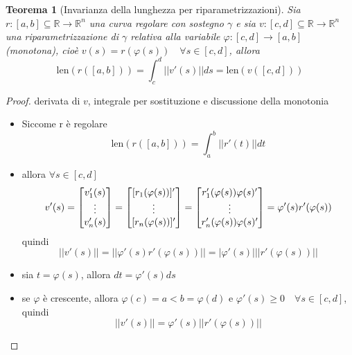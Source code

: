 \documentclass[12pt, a4paper]{article}
\theoremstyle{break}
\newtheorem{theorem}{Teorema} %
\begin{document}
\newpage
\begin{theorem} [Invarianza della lunghezza per riparametrizzazioni]
	Sia $r: [a,b] \subseteq \mathbb{R} \to \mathbb{R}^n$ una curva
	regolare con sostegno $\gamma$ e sia $v: [c,d] \subseteq \mathbb{R}
		\to \mathbb{R}^n$ una riparametrizzazione di $\gamma$ relativa
	alla variabile $ \varphi : [c,d] \to [a,b]$ (monotona), cioè
	$v(s) = r(\varphi (s)) \quad \forall s \in [c,d]$, allora
	\[
		\text{len}(r([a,b])) = \int_{c}^{d} || v'(s) || ds =
		\text{len}(v([c,d])) \]
\end{theorem}
\begin{proof} derivata di $v$, integrale per sostituzione e discussione della
	monotonia
	\begin{itemize}
		\item Siccome r è regolare
		      \[
			      \text{len}(r([a,b])) = \int_{a}^{b} || r'(t) || dt
		      \]
		\item allora $\forall s \in [c,d]$
		      \[
			      v'(s) =
			      \begin{bmatrix}
				      v_1'(s) \\
				      \vdots  \\
				      v_n'(s) \\
			      \end{bmatrix}
			      =
			      \begin{bmatrix}
				      [r_1(\varphi(s))]' \\
				      \vdots             \\
				      [r_n(\varphi(s))]' \\
			      \end{bmatrix}
			      =
			      \begin{bmatrix}
				      r_1'(\varphi(s))\varphi(s)' \\
				      \vdots                      \\
				      r_n'(\varphi(s))\varphi(s)' \\
			      \end{bmatrix}
			      = \varphi'(s) r'(\varphi(s))\\
		      \]
		      quindi
		      \[
			      ||v'(s)|| = ||\varphi'(s) r'(\varphi(s))|| = |\varphi'(s)| ||
			      r'(\varphi(s))||
		      \]
		\item sia $t = \varphi(s)$, allora $ dt = \varphi'(s) ds$
		\item se $\varphi$ è crescente, allora $\varphi(c) = a < b =
			      \varphi(d)$ e $\varphi'(s) \geq 0 \quad \forall s \in [c,d]$,
		      quindi
		      \[
			      ||v'(s)|| = \varphi'(s) || r'(\varphi(s))||
\]
\end{itemize}
\end{proof}
\end{document}
